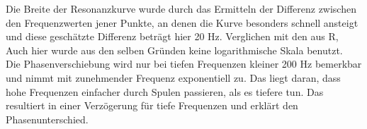 Die Breite der Resonanzkurve wurde durch das Ermitteln der Differenz zwischen den Frequenzwerten jener Punkte, an denen die Kurve besonders schnell ansteigt und diese geschätzte Differenz beträgt hier 20 Hz. 
Verglichen mit den aus R,
\\
Auch hier wurde aus den selben Gründen keine logarithmische Skala benutzt.
\\
Die Phasenverschiebung wird nur bei tiefen Frequenzen kleiner 200 Hz bemerkbar und nimmt mit zunehmender Frequenz exponentiell zu. 
Das liegt daran, dass hohe Frequenzen einfacher durch Spulen passieren, als es tiefere tun. Das resultiert in einer Verzögerung für tiefe Frequenzen und erklärt den Phasenunterschied.

\label{sec:Diskussion}
